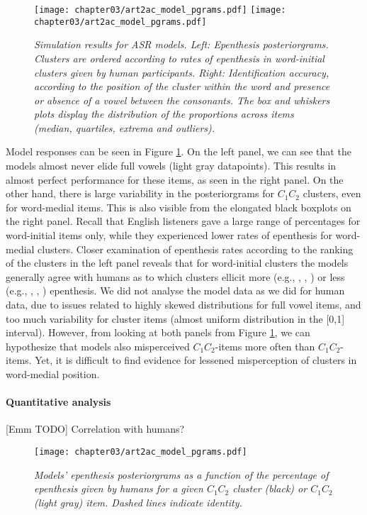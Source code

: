 {%
\begin{figure}[htb!]
    \centering
    \texttt{[image: chapter03/art2ac\_model\_pgrams.pdf]}%
    \hspace{0.5cm}
    \texttt{[image: chapter03/art2ac\_model\_pgrams.pdf]}

    \caption{\textit{Simulation results for ASR models.
      Left: Epenthesis posteriorgrams. Clusters are ordered according to rates of epenthesis in word-initial clusters given by human participants. 
      Right: Identification accuracy, according to the position of the cluster within the word and presence or absence of a vowel between the consonants. The box and whiskers plots display the distribution of the proportions across items (median, quartiles, extrema and outliers).}}
    \label{fig:wpd-mod}
  \end{figure}

  Model responses can be seen in Figure \ref{fig:wpd-mod}. On the left panel, we can see that the models almost never elide full vowels (light gray datapoints). This results in almost perfect performance for these items, as seen in the right panel.
  On the other hand, there is large variability in the posteriorgrams for $C_{1}C_{2}$ clusters, even for word-medial items. This is also visible from the elongated black boxplots on the right panel. Recall that English listeners gave a large range of percentages for word-initial items only, while they experienced lower rates of epenthesis for word-medial clusters.
  Closer examination of epenthesis rates according to the ranking of the clusters in the left panel reveals that for word-initial clusters the models generally agree with humans as to which clusters ellicit more (e.g., , , ) or less (e.g., , , ) epenthesis.
  We did not analyse the model data as we did for human data, due to issues related to highly skewed distributions for full vowel items, and too much variability for cluster items (almost uniform distribution in the [0,1] interval). However, from looking at both panels from Figure \ref{fig:wpd-mod}, we can hypothesize that models also misperceived $C_{1}C_{2}$-items more often than $C_{1}$\textipa{[@]}$C_{2}$-items. Yet, it is difficult to find evidence for lessened misperception of clusters in word-medial position.  

\paragraph{Quantitative analysis}
{\color{red}[Emm TODO] Correlation with humans?}
\begin{figure}[htb!]
    \centering
    \texttt{[image: chapter03/art2ac\_model\_pgrams.pdf]}
    \caption{\textit{Models' epenthesis posteriorgrams as a function of the percentage of epenthesis given by humans for a given $C_{1}C_{2}$ cluster (black) or $C_{1}$\textipa{[@]}$C_{2}$ (light gray) item. Dashed lines indicate identity.}}
    \label{fig:wpd-corr}
  \end{figure}

}
